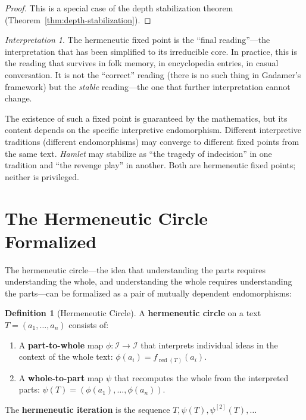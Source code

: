 \documentclass[11pt,openany]{book}
\theoremstyle{definition}
\newtheorem{definition}[axiom]{Definition}
\theoremstyle{plain}
\theoremstyle{remark}
\newtheorem{interpretation}[axiom]{Interpretation}
\newcommand{\IS}{\mathcal{I}}               %
\begin{document}
\begin{proof}
This is a special case of the depth stabilization theorem (Theorem~\ref{thm:depth-stabilization}).
\end{proof}

\begin{interpretation}
The hermeneutic fixed point is the ``final reading''---the interpretation that has been simplified to its irreducible core. In practice, this is the reading that survives in folk memory, in encyclopedia entries, in casual conversation. It is not the ``correct'' reading (there is no such thing in Gadamer's framework) but the \emph{stable} reading---the one that further interpretation cannot change.

The existence of such a fixed point is guaranteed by the mathematics, but its content depends on the specific interpretive endomorphism. Different interpretive traditions (different endomorphisms) may converge to different fixed points from the same text. \emph{Hamlet} may stabilize as ``the tragedy of indecision'' in one tradition and ``the revenge play'' in another. Both are hermeneutic fixed points; neither is privileged.
\end{interpretation}

\section{The Hermeneutic Circle Formalized}

The hermeneutic circle---the idea that understanding the parts requires understanding the whole, and understanding the whole requires understanding the parts---can be formalized as a pair of mutually dependent endomorphisms:

\begin{definition}[Hermeneutic Circle]
A \textbf{hermeneutic circle} on a text $T = (a_1, \ldots, a_n)$ consists of:
\begin{enumerate}
\item A \textbf{part-to-whole} map $\phi : \IS \to \IS$ that interprets individual ideas in the context of the whole text: $\phi(a_i) = f_{\operatorname{red}(T)}(a_i)$.
\item A \textbf{whole-to-part} map $\psi$ that recomputes the whole from the interpreted parts: $\psi(T) = (\phi(a_1), \ldots, \phi(a_n))$.
\end{enumerate}
The \textbf{hermeneutic iteration} is the sequence $T, \psi(T), \psi^{[2]}(T), \ldots$
\end{definition}
\end{document}
